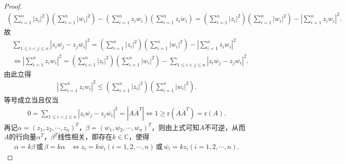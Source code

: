 \documentclass[../../main.tex]{subfiles}%
\begin{document}
\begin{proof}
\begin{align*}
\left( \sum_{i=1}^n{|z_i|^2} \right) \left( \sum_{i=1}^n{|w_i|^2} \right) -\left( \sum_{i=1}^n{z_iw_i} \right) \left( \sum_{i=1}^n{\overline{z_iw_i}} \right)
=\left( \sum_{i=1}^n{|z_i|^2} \right) \left( \sum_{i=1}^n{|w_i|^2} \right) -\left| \sum_{i=1}^n{z_iw_i} \right|^2.
\end{align*}
故
\begin{align*}
&\sum_{1\leqslant i<j\leqslant n}{\left| z_i\overline{w_j}-z_j\overline{w_i} \right|^2}=\left( \sum_{i=1}^n{|z_i|^2} \right) \left( \sum_{i=1}^n{|w_i|^2} \right) -\left| \sum_{i=1}^n{z_iw_i} \right|^2\\
&\Longleftrightarrow \left| \sum_{i=1}^n{z_iw_i} \right|^2=\left( \sum_{i=1}^n{|z_i|^2} \right) \left( \sum_{i=1}^n{|w_i|^2} \right) -\sum_{1\leqslant i<j\leqslant n}{\left| z_i\overline{w_j}-z_j\overline{w_i} \right|^2}.
\end{align*}
由此立得
\begin{align*}
\left| \sum_{i=1}^n{z_iw_i} \right|^2\leqslant \left( \sum_{i=1}^n{|z_i|^2} \right) \left( \sum_{i=1}^n{|w_i|^2} \right) .
\end{align*}
等号成立当且仅当
\begin{align*}
0=\sum_{1\leqslant i<j\leqslant n}{\left| z_i\overline{w_j}-z_j\overline{w_i} \right|^2}=\left| A\overline{A}^T \right|
\Longleftrightarrow 1\geqslant \mathrm{r}\left( A\overline{A}^T \right) =\mathrm{r}\left( A \right) .
\end{align*}
再记$\alpha =\left( z_1,z_2,\cdots ,z_n \right) ^T$，$\beta =\left( \overline{w_1},\overline{w_2},\cdots ,\overline{w_n} \right) ^T$，则由上式可知$A$不可逆，从而$A$的行向量$\alpha ^T$，$\beta ^T$线性相关，即存在$k\in \mathbb{C}$，使得
\begin{align*}
\alpha =k\beta \, \text{或} \, \beta =k\alpha
&\Longleftrightarrow z_i=k\overline{w_i}\left( i=1,2,\cdots ,n \right) \, \text{或} \, \overline{w_i}=kz_i\left( i=1,2,\cdots ,n \right) .
\end{align*}

\end{proof}
\end{document}
